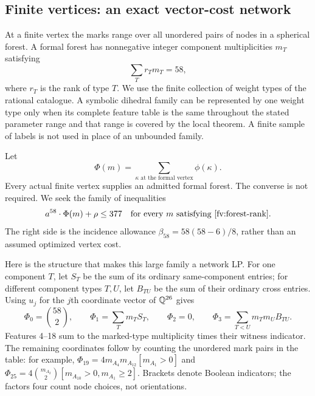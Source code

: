 \subsection{Finite vertices: an exact vector-cost network}
\label{fv:finite-network}

At a finite vertex the marks range over all unordered pairs of
nodes in a spherical forest. A formal forest has nonnegative integer
component multiplicities $m_T$ satisfying
\begin{equation}\label{fv:forest-rank}
                  \sum_T r_Tm_T=58,
\end{equation}
where $r_T$ is the rank of type $T$. We use the finite collection of
weight types of the rational catalogue. A symbolic dihedral family
can be represented by one weight type only when its complete feature
table is the same throughout the stated parameter range and that
range is covered by the local theorem. A finite sample of labels is
not used in place of an unbounded family.

Let
\[
 \Phi(m)=\sum_{\kappa\text{ at the formal vertex}}\phi(\kappa).
\]
Every actual finite vertex supplies an admitted formal forest. The
converse is not required. We seek the family of inequalities
\begin{equation}\label{fv:finite-budget-endpoint}
                   a^{58}\cdot\Phi(m)+\rho\le377
                  \quad\hbox{for every }m\text{ satisfying
                  \eqref{fv:forest-rank}}.
\end{equation}
The right side is the incidence allowance
$\beta_{58}=58(58-6)/8$, rather than an assumed optimized vertex cost.

Here is the structure that makes this large family a network LP.
For one component $T$, let $S_T$ be the sum of its ordinary
same-component entries; for different component types $T,U$, let
$B_{TU}$ be the sum of their ordinary cross entries. Using $u_j$
for the $j$th coordinate vector of $\mathbb Q^{26}$ gives
\begin{equation}\label{fv:first-aggregates}
 \Phi_0=\binom{58}{2},\qquad
 \Phi_1=\sum_Tm_TS_T,\qquad
 \Phi_2=0,\qquad
 \Phi_3=\sum_{T<U}m_Tm_UB_{TU}.
\end{equation}
Features 4--18 sum to the marked-type multiplicity times their witness
indicator. The remaining coordinates follow by counting the unordered
mark pairs in the table: for example,
$\Phi_{19}=4m_{A_4}m_{A_{12}}[m_{A_1}>0]$ and
$\Phi_{25}=4\binom{m_{A_2}}2[m_{A_{10}}>0,m_{A_1}\ge2]$.
Brackets denote Boolean indicators; the factors four count node choices,
not orientations.

